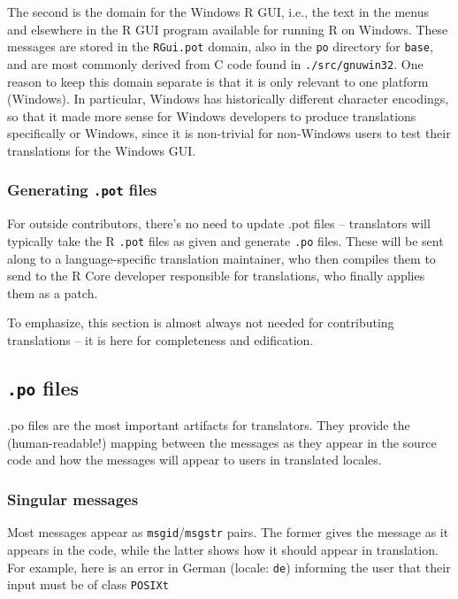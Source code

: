 \documentclass[
]{book}
\begin{document}
The second is the domain for the Windows R GUI, i.e., the text in the
menus and elsewhere in the R GUI program available for running R on
Windows. These messages are stored in the \texttt{RGui.pot} domain, also in the
\texttt{po} directory for \texttt{base}, and are most commonly derived from C code
found in \texttt{./src/gnuwin32}. One reason to keep this domain separate is
that it is only relevant to one platform (Windows). In particular,
Windows has historically different character encodings, so that it made
more sense for Windows developers to produce translations specifically
or Windows, since it is non-trivial for non-Windows users to test their
translations for the Windows GUI.

\subsubsection{\texorpdfstring{Generating \texttt{.pot} files}{Generating .pot files}}\label{generating-.pot-files}

For outside contributors, there's no need to update .pot files --
translators will typically take the R \texttt{.pot} files as given and generate
\texttt{.po} files. These will be sent along to a language-specific translation
maintainer, who then compiles them to send to the R Core developer
responsible for translations, who finally applies them as a patch.

To emphasize, this section is almost always not needed for contributing
translations -- it is here for completeness and edification.

\subsection{\texorpdfstring{\texttt{.po} files}{.po files}}\label{po-files}

.po files are the most important artifacts for translators. They provide
the (human-readable!) mapping between the messages as they appear in the
source code and how the messages will appear to users in translated
locales.

\subsubsection{Singular messages}\label{singular-messages}

Most messages appear as \texttt{msgid}/\texttt{msgstr} pairs. The former gives the
message as it appears in the code, while the latter shows how it should
appear in translation. For example, here is an error in German (locale:
\texttt{de}) informing the user that their input must be of class \texttt{POSIXt}
\end{document}
